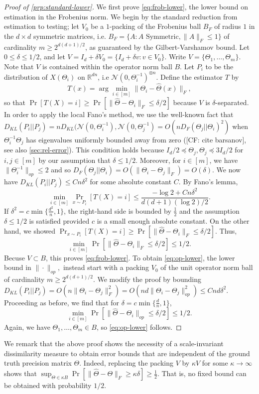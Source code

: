\documentclass[aos]{imsart}
\theoremstyle{definition}
\numberwithin{equation}{section}
\newcommand{\R}{{\mathbb{R}}}
\newcommand{\htheta}{\widehat{\Theta}}
\newcommand{\ot}{\otimes}
\newcommand{\CF}[1]{{\color{purple}[CF: #1]}}
\begin{document}
\begin{proof}[Proof of \cref{prp:standard-lower}]
We first prove \cref{eq:frob-lower}, the lower bound on estimation in the Frobenius norm. We begin by the standard reduction from estimation to testing; let $V_0$ be a $1$-packing of the Frobenius ball $B_F$ of radius $1$ in the $d\times d$ symmetric matrices, i.e. $B_F = \{A: A \text{ Symmetric}, \|A\|_F \leq 1\}$ of cardinality $m \geq 2^{d(d+1)/2}$, as guaranteed by the Gilbert-Varshamov bound. Let $0 \leq \delta \leq 1/2$, and let $V = I_d + \delta V_0 = \{I_d + \delta v: v \in V_0\}$. Write $V = \{\Theta_1, \dots, \Theta_m\}$. Note that $V$ is contained within the operator norm ball $B$.
Let $P_i$ to be the distribution of $X(\Theta_i)$ on $\R^{dn}$, i.e $\mathcal{N}(0, \Theta^{-1}_i)^{\ot n}$. Define the estimator $T$ by 
$$T(x) = \arg\min_{i \in [m]} \|\Theta_i - \htheta(x)\|_F,$$
so that $\Pr[T(X) = i] \geq \Pr[\|\htheta -  \Theta_i\|_F \leq \delta/2]$ because $V$ is $\delta$-separated. In order to apply the local Fano's method, we use the well-known fact that $D_{KL}(P_i|| P_j) = n D_{KL}(\mathcal{N}(0, \Theta_i^{-1}), \mathcal{N}(0, \Theta_j^{-1}) = O(nD_{F}(\Theta_j || \Theta_i)^2)$ when $\Theta_i^{-1}\Theta_j$ has eigenvalues uniformly bounded away from zero (\CF{cite barsanov}, see also \cref{sec:rel-error}). This condition holds because $I_d/2 \preceq \Theta_j, \Theta_j \preceq 3I_d/2$ for $i,j \in [m]$ by our assumption that $\delta \leq 1/2$. Moreover, for $i \in [m]$, we have $\|\Theta_i^{-1}\|_{op} \leq 2$ and so $D_F(\Theta_j|| \Theta_i) = O( \|\Theta_i - \Theta_j\|_F) = O(\delta).$ We now have $D_{KL}(P_i|| P_j) \leq Cn \delta^2$ for some absolute constant $C$. By Fano's lemma, 
 $$\min_{i \in [m]} \Pr_{x \sim P_i}[T(X) =  i] \leq \frac{ - \log 2 + C n \delta^2}{d(d+1)(\log 2)/2 }.$$
If $\delta^2 = c\min\{ \frac{d^2}{n}, 1\}$, the right-hand side is bounded by $\frac{1}{2}$ and the assumption $\delta \leq 1/2$ is satisfied provided $c$ is a small enough absolute constant. On the other hand, we showed $\Pr_{x \sim P_i}[T(X) =  i] \geq \Pr[\|\htheta -  \Theta_i\|_F \leq \delta/2]$. Thus, 
$$\min_{i \in [m]} \Pr[ \|\htheta - \Theta_i\|_F \leq \delta/2] \leq 1/2.$$
Becuse $V \subset B$, this proves \cref{eq:frob-lower}. 
To obtain \cref{eq:op-lower}, the lower bound in $\| \cdot \|_{op},$ instead start with a packing $V_0$ of the unit operator norm ball of cardinality $m \geq 2^{d(d+1)/2}$. We modify the proof by bounding $D_{KL}(P_i || P_j) = O(n \| \Theta_i - \Theta_j\|_F^2) = O(n d \|\Theta_i - \Theta_j\|_{op}^2) \leq C nd \delta^2.$ Proceeding as before, we find that for $\delta = c \min \{\frac{d}{n}, 1\}$, 
$$\min_{i \in [m]} \Pr[ \|\htheta - \Theta_i\|_{op} \leq \delta/2] \leq 1/2.$$
Again, we have $\Theta_1, \dots, \Theta_m \in B$, so \cref{eq:op-lower} follows. \end{proof}
We remark that the above proof shows the necessity of a scale-invariant dissimilarity measure to obtain error bounds that are independent of the ground truth precision matrix $\Theta$. Indeed, replacing the packing $V$ by $\kappa V$ for some $\kappa \to \infty$ shows that $\sup_{\Theta \in \kappa B} \Pr\left[ \| \htheta - \Theta\|_F \geq \kappa \delta \right] \geq \frac{1}{2}$. That is, no fixed bound can be obtained with probability $1/2$. 
\end{document}
